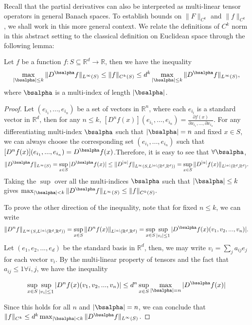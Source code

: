 Recall that the partial derivatives can also be interpreted as multi-linear tensor operators in general Banach spaces. To establish bounds on $\|F\|_{C^k}$ and $\|f\|_{C^k}$, we shall work in this more general context. We relate the definitions of $C^k$ norm in this abstract setting to the classical definition on Euclidean space through the following lemma:



\begin{lemma}\label{lemma:relationBetweenNorms}
Let $f$ be a function $f: S\subseteq\mathbb{R}^d\rightarrow\mathbb{R}$, then we have the inequality $$\max_{|\bsalpha|\leq k} \|D^\bsalpha f\|_{L^\infty(S)} \leq \|f\|_{C^k(S)} \leq d^k\max_{|\bsalpha|\leq k}\|D^\bsalpha f\|_{L^\infty(S)},$$ where $\bsalpha$ is a multi-index of length $|\bsalpha|$. 
\end{lemma}

\begin{proof}
Let $(e_{i_1}, ..., e_{i_n})$ be a set of vectors in $\mathbb{R}^n$, where each $e_{i_l}$ is a standard vector in $\mathbb{R}^d$, then for any $n\leq k$, $[D^nf(x)](e_{i_1}, ..., e_{i_n}) = \frac{\partial f(x)}{\partial x_{i_1},..., \partial x_{i_n}}$. For any differentiating multi-index $\bsalpha$ such that $|\bsalpha| = n$ and fixed $x\in S$, we can always choose the corresponding set $(e_{i_1}, ..., e_{i_n})$ such that $[D^nf(x)](e_{i_1}, ..., e_{i_n}) = D^\bsalpha f(x)$.Therefore, it is easy to see that $\forall \bsalpha$, $$\|D^\bsalpha f\|_{L^\infty(S)} = \sup_{x\in S}|D^\bsalpha f(x)| \leq \|D^{|\alpha|}f\|_{L^\infty(S, L^{|\alpha|}(\mathbb{R}^d,\mathbb{R}^d))} = \sup_{x\in S}\|D^{|\alpha|}f(x)\|_{L^{|\alpha|}(\mathbb{R}^d,\mathbb{R}^d)}.$$ Taking the $\sup$ over all the multi-indices $\bsalpha$ such that $|\bsalpha| \leq k$ gives $\max_{|\bsalpha|<k} \|D^\bsalpha f\|_{L^\infty(S)} \leq \|f\|_{C^k(S)}.$


To prove the other direction of the inequality, note that for fixed $n \leq k$, we can write $$\|D^nf\|_{L^\infty(S, L^{|\alpha|}(\mathbb{R}^d,\mathbb{R}^d))} = \sup_{x\in S}\|D^n f(x)\|_{L^{|\alpha|}(\mathbb{R}^d,\mathbb{R}^d)} = \sup_{x\in S}\sup_{|v_i|\leq 1}|D^\bsalpha f(x)(v_1,v_2,...,v_n)|.$$ Let $(e_{1}, e_{2},...,e_{d})$ be the standard basis in $\mathbb{R}^d$, then, we may write $v_i = \sum_{j}a_{ij}e_j$ for each vector $v_i$. By the multi-linear property of tensors and the fact that $a_{ij} \leq 1 \forall i,j$, we have the inequality 

$$\sup_{x\in S}\sup_{|v_i|\leq 1}|D^n f(x)(v_1,v_2,...,v_n)| \leq d^n\sup_{x\in S}\max_{|\bsalpha| = n}|D^\bsalpha f(x)| $$


Since this holds for all $n$ and $|\bsalpha| = n$, we can conclude that $\|f\|_{C^k} \leq d^k\max_{|\bsalpha|<k} \|D^\bsalpha f\|_{L^\infty(S)}$.
\end{proof}

